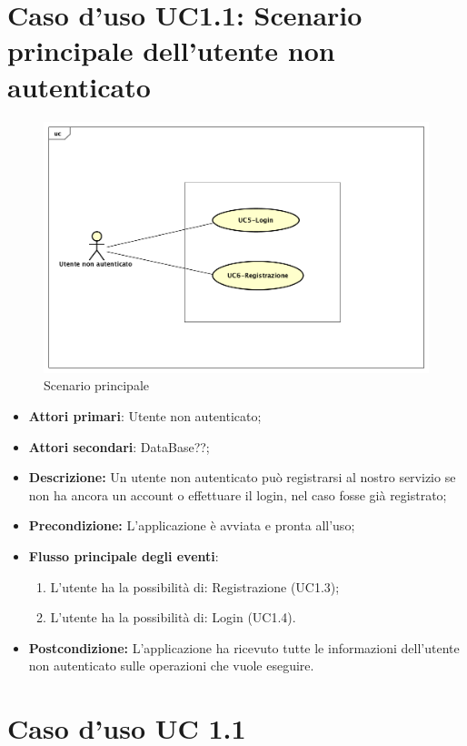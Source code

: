 \section{Caso d'uso UC1.1: Scenario principale dell'utente non autenticato}
\begin{figure} [h]
	\centering
	\includegraphics[scale=0.4]{./Diagram/UC1.png}
	\caption{Scenario principale}\label{}
\end{figure}
\begin{itemize}
	\item \textbf{Attori primari}: Utente non autenticato;
	\item \textbf{Attori secondari}: DataBase??;
	\item \textbf{Descrizione:} Un utente non  autenticato può registrarsi al nostro servizio se non ha ancora un account o effettuare il login, nel caso fosse già registrato;
	\item \textbf{Precondizione:} L'applicazione è avviata e pronta all'uso;
	\item \textbf{Flusso principale degli eventi}:
		\begin{enumerate}
			\item L'utente ha la possibilità di: Registrazione (UC1.3);
			\item L'utente ha la possibilità di: Login (UC1.4).
		\end{enumerate}
		\item \textbf{Postcondizione:} L'applicazione ha ricevuto tutte le informazioni dell'utente non autenticato sulle operazioni che vuole eseguire.
\end{itemize}
\section{Caso d'uso UC 1.1}

